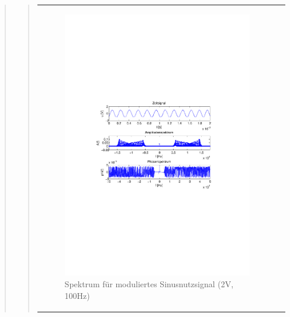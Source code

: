 \begin{quote}
\begin{quote}
\begin{center}
\begin{tabular}{ll}
\begin{minipage}{0.6\textwidth}
                \end{minipage}
                \begin{minipage}{0.6\textwidth}

                     \begin{figure}[H]
                        \label{fig:}
                        \includegraphics[scale=0.5, trim = 2cm 6.5cm 1.5cm
                        8.5cm, clip]{./Bilder/sin_a2_f100}
                        \caption{Spektrum für moduliertes Sinusnutzsignal (2V,
                        100Hz)}
                    \end{figure}
               \vspace{-1.5em}

                \end{minipage}


\end{tabular}
\end{center}
\end{quote}
\end{quote}
